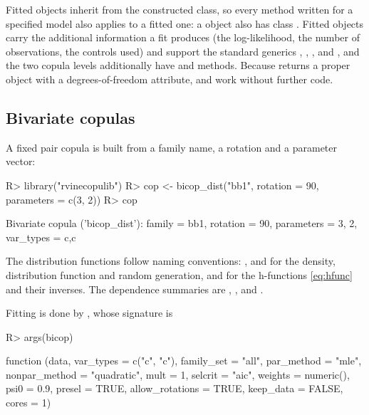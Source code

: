 \documentclass[article]{jss}
\begin{document}
Fitted objects inherit from the constructed class, so every method written
for a specified model also applies to a fitted one: a  object
also has class .  Fitted objects carry the
additional information a fit produces (the log-likelihood, the number of
observations, the controls used) and
support the standard generics , ,
,  and , and the two copula
levels additionally have  and  methods.  Because 
returns a proper  object with a degrees-of-freedom attribute,
 and  work without further code.

\subsection{Bivariate copulas}\label{sec:bicop}

A fixed pair copula is built from a family name, a rotation and a parameter
vector:

\begin{CodeChunk}
\begin{CodeInput}
R> library("rvinecopulib")
R> cop <- bicop_dist("bb1", rotation = 90, parameters = c(3, 2))
R> cop
\end{CodeInput}
\begin{CodeOutput}
Bivariate copula ('bicop_dist'): family = bb1, rotation = 90,
parameters = 3, 2, var_types = c,c
\end{CodeOutput}
\end{CodeChunk}

The distribution functions follow  naming conventions:
,  and  for the density,
distribution function and random generation, and  for the
h-functions \eqref{eq:hfunc} and their inverses.  The dependence summaries are
, , 
and .

Fitting is done by , whose signature is

\begin{CodeChunk}
\begin{CodeInput}
R> args(bicop)
\end{CodeInput}
\begin{CodeOutput}
function (data, var_types = c("c", "c"), family_set = "all",
    par_method = "mle", nonpar_method = "quadratic", mult = 1,
    selcrit = "aic", weights = numeric(), psi0 = 0.9, presel = TRUE,
    allow_rotations = TRUE, keep_data = FALSE, cores = 1)
\end{CodeOutput}
\end{CodeChunk}
\end{document}
